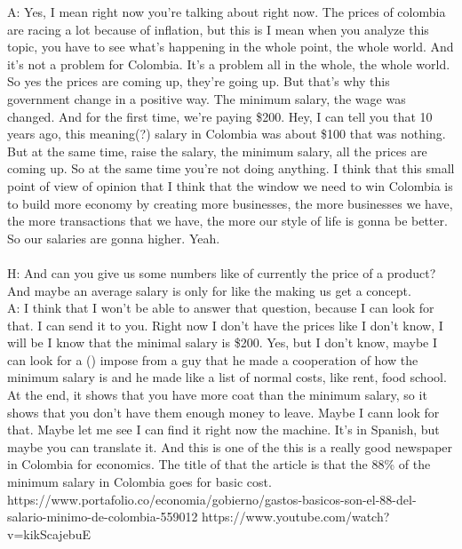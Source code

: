 \documentclass{phyasgn}\usepackage{nag}
\begin{document}
A: Yes, I mean right now you're talking about right now. The prices of colombia are racing a lot because of inflation, but this is I mean when you analyze this topic, you have to see what's happening in the whole point, the whole world. And it's not a problem for Colombia. It's a problem all in the whole, the whole world. So yes the prices are coming up, they're going up. But that's why this government change in a positive way. The minimum salary, the wage was changed. And for the first time, we're paying \$200. Hey, I can tell you that 10 years ago, this meaning(?) salary in Colombia was about \$100 that was nothing. But at the same time, raise the salary, the minimum salary, all the prices are coming up. So at the same time you're not doing anything. I think that this small point of view of opinion that I think that the window we need to win Colombia is to build more economy by creating more businesses, the more businesses we have, the more transactions that we have, the more our style of life is gonna be better. So our salaries are gonna higher. Yeah.\\
\\
H: And can you give us some numbers like of currently the price of a product? And maybe an average salary is only for like the making us get a concept.\\
A: I think that I won't be able to answer that question, because I can look for that. I can send it to you. Right now I don't have the prices like I don't know, I will be I know that the minimal salary is \$200. Yes, but I don't know, maybe I can look for a () impose from a guy that he made a cooperation of how the minimum salary is and he made like a list of normal costs, like rent, food school. At the end, it shows that you have more coat than the minimum salary, so it shows that you don't have them enough money to leave. Maybe I cann look for that. Maybe let me see I can find it right now the machine. It's in Spanish, but maybe you can translate it. And this is one of the this is a really good newspaper in Colombia for economics. The title of that the article is that the 88\% of the minimum salary in Colombia goes for basic cost. https://www.portafolio.co/economia/gobierno/gastos-basicos-son-el-88-del-salario-minimo-de-colombia-559012
https://www.youtube.com/watch?v=kikScajebuE\\
\end{document}
